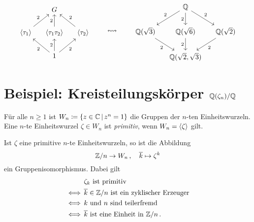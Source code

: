 \[
  \begin{tikzcd}[column sep = small]
      {}
    & G
    & {}
    \\
      \generated{\tau_1}
      \arrow{ru}[above left]{2}
    & \generated{\tau_1 \tau_2}
      \arrow{u}{2}
    & \generated{\tau_2}
      \arrow{lu}[above right]{2}
    \\
      {}
    & 1
      \arrow{lu}[below left]{2}
      \arrow{u}{2}
      \arrow{ru}[below right]{2}
    & {}
  \end{tikzcd}
  \qquad\leftrightsquigarrow\qquad
  \begin{tikzcd}[column sep = small]
      {}
    & \Rational
      \arrow{dl}[above left]{2}
      \arrow{d}[left]{2}
      \arrow{dr}[above right]{2}
    & {}
    \\
      \Rational(\sqrt{3})
      \arrow{dr}[below left]{2}
    & \Rational(\sqrt{6})
      \arrow{d}[left]{2}
    & \Rational(\sqrt{2})
      \arrow{dl}[below right]{2}
    \\
      {}
    & \Rational(\sqrt{2},\sqrt{3})
    & {}
  \end{tikzcd}
\]





\section{Beispiel: Kreisteilungskörper \texorpdfstring{$\mathbb{Q}(\zeta_n)/\mathbb{Q}$}{Q(zeta\_n)/Q}}

\begin{definition}
  Für alle $n \geq 1$ ist $W_n \defined \{z \in \Complex \suchthat z^n = 1\}$ die Gruppen der $n$-ten Einheitswurzeln.
  Eine $n$-te Einheitswurzel $\zeta \in W_n$ ist \emph{primitiv}, wenn $W_n = \langle\zeta\rangle$ gilt.
\end{definition}

Ist $\zeta$ eine primitive $n$-te Einheitswurzeln, so ist die Abbildung
\[
          \mathbb{Z}/n
  \to     W_n \,,
  \quad   \overline{k}
  \mapsto \zeta^k
\]
ein Gruppenisomorphismus.
Dabei gilt
\begin{align*}
      &\, \text{$\zeta_k$ ist primitiv} \\
  \iff&\, \text{$\overline{k} \in \mathbb{Z}/n$ ist ein zyklischer Erzeuger} \\
  \iff&\, \text{$k$ und $n$ sind teilerfremd} \\
  \iff&\, \text{$\overline{k}$ ist eine Einheit in $\mathbb{Z}/n$} \,.
\end{align*}

